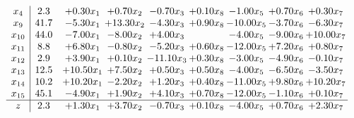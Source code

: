 \documentclass[9pt]{article}
\begin{document}
\[\begin{array}{c| c c@{\hskip 2pt} c@{\hskip 2pt} c@{\hskip 2pt} c@{\hskip 2pt} c@{\hskip 2pt} c@{\hskip 2pt} c@{\hskip 2pt} }
 x_{4}   &  2.3 & +  0.30 x_{1} & +  0.70 x_{2} & -0.70 x_{3} & +  0.10 x_{8} & -1.00 x_{5} & +  0.70 x_{6} & +  0.30 x_{7}\\
 x_{9}   &  41.7 & -5.30 x_{1} & + 13.30 x_{2} & -4.30 x_{3} & +  0.90 x_{8} & -10.00 x_{5} & -3.70 x_{6} & -6.30 x_{7}\\
 x_{10}   &  44.0 & -7.00 x_{1} & -8.00 x_{2} & +  4.00 x_{3} &   & -4.00 x_{5} & -9.00 x_{6} & + 10.00 x_{7}\\
 x_{11}   &  8.8 & +  6.80 x_{1} & -0.80 x_{2} & -5.20 x_{3} & +  0.60 x_{8} & -12.00 x_{5} & +  7.20 x_{6} & +  0.80 x_{7}\\
 x_{12}   &  2.9 & +  3.90 x_{1} & +  0.10 x_{2} & -11.10 x_{3} & +  0.30 x_{8} & -3.00 x_{5} & -4.90 x_{6} & -0.10 x_{7}\\
 x_{13}   &  12.5 & + 10.50 x_{1} & +  7.50 x_{2} & +  0.50 x_{3} & +  0.50 x_{8} & -4.00 x_{5} & -6.50 x_{6} & -3.50 x_{7}\\
 x_{14}   &  10.2 & + 10.20 x_{1} & -2.20 x_{2} & +  1.20 x_{3} & +  0.40 x_{8} & -11.00 x_{5} & +  9.80 x_{6} & + 10.20 x_{7}\\
 x_{15}   &  45.1 & -4.90 x_{1} & +  1.90 x_{2} & +  4.10 x_{3} & +  0.70 x_{8} & -12.00 x_{5} & -1.10 x_{6} & +  0.10 x_{7}\\
\hline
z    &  2.3 & +  1.30 x_{1} & +  3.70 x_{2} & -0.70 x_{3} & +  0.10 x_{8} & -4.00 x_{5} & +  0.70 x_{6} & +  2.30 x_{7}\\
\end{array}\]
\end{document}
